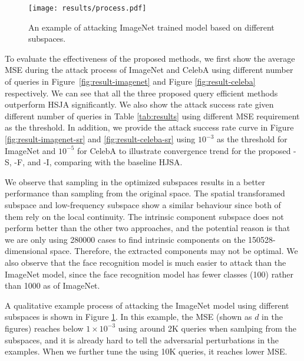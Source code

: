 \begin{figure}
    \centering
    \texttt{[image: results/process.pdf]}
    \caption{An example of attacking ImageNet trained model based on different subspaces.}
    \label{fig:result-process}
    \vspace{-0.5cm}
\end{figure}

To evaluate the effectiveness of the proposed methods, we first show the average MSE during the attack process of ImageNet and CelebA using different number of queries in Figure~\ref{fig:result-imagenet} and Figure \ref{fig:result-celeba} respectively. 
We can see that all the three proposed query efficient methods outperform HSJA significantly.
We also show the attack success rate given different number of queries in Table \ref{tab:results} using different MSE requirement as the threshold. In addition, we provide the attack success rate curve in Figure \ref{fig:result-imagenet-sr} and \ref{fig:result-celeba-sr} using $10^{-3}$ as the threshold for ImageNet and $10^{-5}$ for CelebA to illustrate convergence trend for the proposed \name-S, \name-F, and \name-I, comparing with the baseline HJSA.

We observe that sampling in the optimized subspaces results in a better performance than sampling from the original space. The spatial transforamed subspace and low-frequency subspace show a similar behaviour since both of them rely on the local continuity. The intrinsic component subspace does not perform better than the other two approaches, and the potential reason is that we are only using 280000 cases to find intrinsic components on the 150528-dimensional space. Therefore, the extracted components may not be optimal. We also observe that the face recognition model is much easier to attack than the ImageNet model, since the face recognition model has fewer classes (100) rather than 1000 as of ImageNet. 

A qualitative example process of attacking the ImageNet model using different subspaces is shown in Figure \ref{fig:result-process}. In this example, the MSE (shown as $d$ in the figures) reaches below $1\times10^{-3}$ using around 2K queries when samlping from the subspaces, and it is already hard to tell the adversarial perturbations in the examples. When we further tune the \advimage using 10K queries, it reaches lower MSE.




